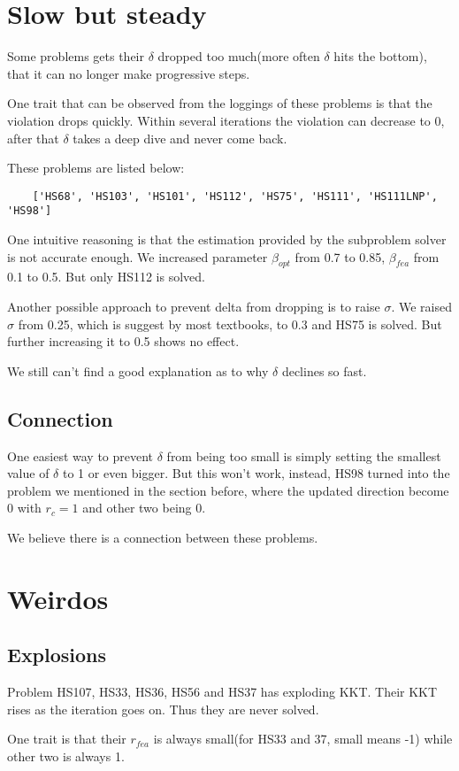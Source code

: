 \documentclass[10pt]{article}
\begin{document}
\section{Slow but steady}\par
	Some problems gets their $\delta$ dropped too much(more often $\delta$ hits the bottom), that it can no longer make progressive steps. \par
	One trait that can be observed from the loggings of these problems is that the violation drops quickly. Within several iterations the violation can decrease to 0, after that $\delta$ takes a deep dive and never come back. \par
	These problems are listed below:
	\begin{lstlisting}
	['HS68', 'HS103', 'HS101', 'HS112', 'HS75', 'HS111', 'HS111LNP', 'HS98']
	\end{lstlisting}
	One intuitive reasoning is that the estimation provided by the subproblem solver is not accurate enough. We increased parameter $\beta_{opt}$ from 0.7 to 0.85, $\beta_{fea}$ from 0.1 to 0.5. But only HS112 is solved. \par
	Another possible approach to prevent delta from dropping is to raise $\sigma$. We raised $\sigma$ from 0.25, which is suggest by most textbooks, to 0.3 and HS75 is solved. But further increasing it to 0.5 shows no effect. \par
	We still can't find a good explanation as to why $\delta$ declines so fast.
	\subsection{Connection}
		One easiest way to prevent $\delta$ from being too small is simply setting the smallest value of $\delta$ to 1 or even bigger. But this won't work, instead, HS98 turned into the problem we mentioned in the section before, where the updated direction become 0 with $r_c = 1$ and other two being 0.
		\par We believe there is a connection between these problems.

\section{Weirdos}
	\subsection{Explosions}
		Problem HS107, HS33, HS36, HS56 and HS37 has exploding KKT. Their KKT rises as the iteration goes on. Thus they are never solved. \par
		One trait is that their $r_{fea}$ is always small(for HS33 and 37, small means -1) while other two is always 1.
\end{document}
